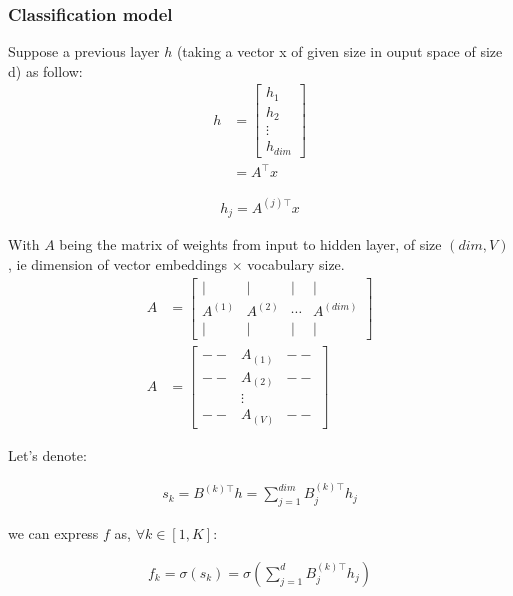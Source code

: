 \cite[Enriching Word Vectors with Subword Information]{fasttextEnriching}
\cite[Bag of Tricks for Efficient Text Classification]{fasttextTricks}

\subsubsection{Classification model}
Suppose a previous layer $h$ (taking a vector x of given size in ouput space of size d) as follow:
\begin{align}
	h 
	&= 
	\begin{bmatrix} 
		h_1 \\
		h_2 \\
		\vdots \\
		h_{\textit{dim}}
	\end{bmatrix}\\
	&= A^{\top}x
\end{align}


\begin{align}
	h_j = A^{(j)\top}x
\end{align}

With $A$ being the matrix of weights from input to hidden layer, of size $(\textit{dim}, V)$, ie dimension of vector embeddings $\times$ vocabulary size.
\begin{align}
	A &= \left[\begin{array}{cccc}| & | & | & | \\ A^{(1)} & A^{(2)} & \cdots & A^{(\textit{dim})} \\ | & | & | & | \end{array}\right]\\
	A &= \left[
		\begin{array}{cccc} 
		  	-- & A_{(1)} & -- \\
		  	-- & A_{(2)} & -- \\
		  	&\vdots 	\\
		  	-- & A_{(V)} & --
		\end{array}\right]
\end{align}



Let's denote:

\begin{align}
	s_k  = B^{(k)\top} h = \sum_{j=1}^{\textit{dim}} B^{(k)\top}_j h_j 
\end{align}

we can express $f$ as, $\forall k \in [1, K]$:

\begin{align}
	f_k  = \sigma(s_k) = \sigma( \sum_{j=1}^{d} B^{(k)\top}_j h_j) 
\end{align}

